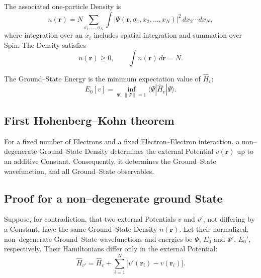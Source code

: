 \documentclass[a4paper, 10pt, onepage]{elegantbook}
\begin{document}
{The associated one-particle Density is
\begin{equation}
n(\mathbf r)
=
N\sum_{\sigma_1,\ldots,\sigma_N}
\int
|\Psi(\mathbf r,\sigma_1,x_2,\ldots,x_N)|^2
\,dx_2\cdots dx_N,
\label{eq:Density}
\end{equation}
where integration over an \(x_i\) includes spatial integration and
summation over Spin. The Density satisfies
\begin{equation}
n(\mathbf r)\geq 0,
\qquad
\int n(\mathbf r)\,d\mathbf r=N.
\end{equation}

The Ground--State Energy is the minimum expectation value of
\(\hat H_v\):
\begin{equation}
E_0[v]
=
\inf_{\Psi,\ \|\Psi\|=1}
\langle\Psi|\hat H_v|\Psi\rangle.
\label{eq:ground-Energy}
\end{equation}

\subsection{First Hohenberg--Kohn theorem}

\begin{theorem}
For a fixed number of Electrons and a fixed Electron--Electron
interaction, a non--degenerate Ground--State Density determines the
external Potential \(v(\mathbf r)\) up to an additive Constant.
Consequently, it determines the Ground--State wavefunction, and all
Ground--State observables.
\end{theorem}

\subsection{Proof for a non--degenerate ground State}

Suppose, for contradiction, that two external Potentials \(v\) and
\(v'\), not differing by a Constant, have the same Ground--State
Density \(n(\mathbf r)\). Let their normalized, non--degenerate
Ground--State wavefunctions and energies be \(\Psi\), \(E_0\) and
\(\Psi'\), \(E_0'\), respectively. Their Hamiltonians differ only in
the external Potential:
\begin{equation}
\hat H_{v'}=\hat H_v+\sum_{i=1}^N
\bigl[v'(\mathbf r_i)-v(\mathbf r_i)\bigr].
\end{equation}

}
\end{document}
